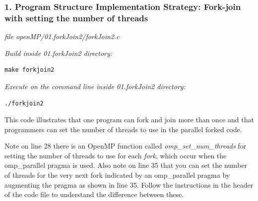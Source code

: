 \documentclass[letterpaper,10pt,openany,oneside]{sphinxmanual}
\begin{document}
\subsubsection{1. Program Structure Implementation Strategy: Fork-join with setting the number of threads}
\label{SharedMemory/ProgStructure_Barrier:program-structure-implementation-strategy-fork-join-with-setting-the-number-of-threads}
\emph{file openMP/01.forkJoin2/forkJoin2.c}

\emph{Build inside 01.forkJoin2 directory:}

\begin{Verbatim}[commandchars=\\\{\}]
make forkjoin2
\end{Verbatim}

\emph{Execute on the command line inside 01.forkJoin2 directory:}

\begin{Verbatim}[commandchars=\\\{\}]
./forkjoin2
\end{Verbatim}

This code illustrates that one program can fork and join more than once
and that programmers can set the number of threads to use in the parallel forked code.

Note on line 28 there is an OpenMP function called \emph{omp\_set\_num\_threads}
for setting the number of threads to use for each
\emph{fork}, which occur when the omp\_parallel pragma is used.
Also note on line 35 that you can set the number of threads for the very next
fork indicated by an omp\_parallel pragma by augmenting the pragma as shown in line 35.
Follow the instructions in the header of the code file to understand the difference
between these.
\end{document}
